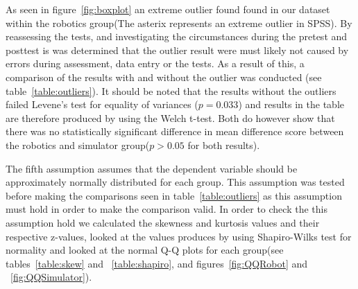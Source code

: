 
\bigskip\noindent
As seen in figure~\ref{fig:boxplot} an extreme outlier found found in our dataset within the robotics group(The asterix represents an extreme outlier in SPSS). By reassessing the tests, and investigating the circumstances during the pretest and posttest is was determined that the outlier result were must likely not caused by errors during assessment, data entry or the tests. As a result of this, a comparison of the results with and without the outlier was conducted (see table~\ref{table:outliers}). 
It should be noted that the results without the outliers failed Levene's test for equality of variances ($p = 0.033$) and results in the table are therefore produced by using the Welch t-test. Both do however show that there was no statistically significant difference in mean difference score between the robotics and simulator group($p > 0.05$ for both results). 

\bigskip\noindent
{}

\bigskip\noindent
The fifth assumption assumes that the dependent variable should be approximately normally distributed for each group. This assumption was tested before making the comparisons seen in table~\ref{table:outliers} as this assumption must hold in order to make the comparison valid. 
In order to check the this assumption hold we calculated the skewness and kurtosis values and their respective z-values, looked at the values produces by using Shapiro-Wilks test for normality and looked at the normal Q-Q plots for each group(see tables~\ref{table:skew} and ~\ref{table:shapiro}, and figures~\ref{fig:QQRobot} and ~\ref{fig:QQSimulator}).

